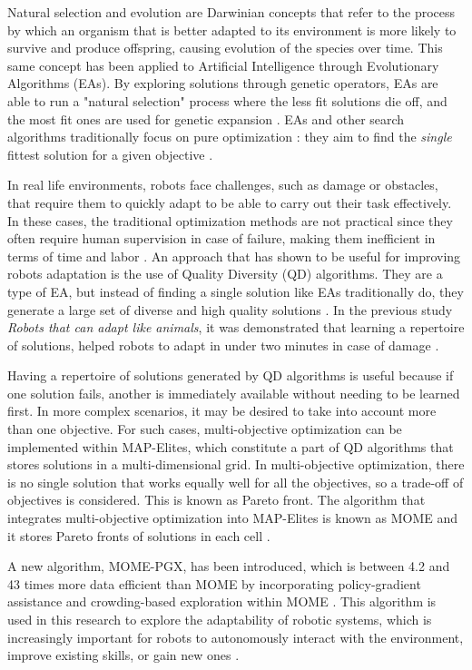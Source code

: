 \documentclass[12pt]{article}
\begin{document}
Natural selection and evolution are Darwinian concepts that refer to the process by which an organism that is better adapted to its environment is more likely to survive and produce offspring, causing evolution of the species over time. This same concept has been applied to Artificial Intelligence through Evolutionary Algorithms (EAs). By exploring solutions through genetic operators, EAs are able to run a "natural selection" process where the less fit solutions die off, and the most fit ones are used for genetic expansion \citep{Soni_2021}. EAs and other search algorithms traditionally focus on pure optimization \citep{Cully_Mouret_Doncieux_2019}: they aim to find the \textit{single} fittest solution for a given objective \citep{qian2024quality}.

In real life environments, robots face challenges, such as damage or obstacles, that require them to quickly adapt to be able to carry out their task effectively. In these cases, the traditional optimization methods are not practical since they often require human supervision in case of failure, making them inefficient in terms of time and labor \citep{kober2013reinforcement}. An approach that has shown to be useful for improving robots adaptation is the use of Quality Diversity (QD) algorithms. They are a type of EA, but instead of finding a single solution like EAs traditionally do, they generate a large set of diverse and high quality solutions \citep{Cully_Mouret_Doncieux_2019}. In the previous study \textit{Robots that can adapt like animals}, it was demonstrated that learning a repertoire of solutions, helped robots to adapt in under two minutes in case of damage \citep{cully2015robots}.

Having a repertoire of solutions generated by QD algorithms is useful because if one solution fails, another is immediately available without needing to be learned first. In more complex scenarios, it may be desired to take into account more than one objective. For such cases, multi-objective optimization can be implemented within MAP-Elites, which constitute a part of QD algorithms that stores solutions in a multi-dimensional grid. In multi-objective optimization, there is no single solution that works equally well for all the objectives, so a trade-off of objectives is considered. This is known as Pareto front. The algorithm that integrates multi-objective optimization into MAP-Elites is known as MOME and it stores Pareto fronts of solutions in each cell \citep{mouret2015illuminating}. 

A new algorithm, MOME-PGX, has been introduced, which is between 4.2 and 43 times more data efficient than MOME by incorporating policy-gradient assistance and crowding-based exploration within MOME \citep{janmohamed2023improving}. This algorithm is used in this research to explore the adaptability of robotic systems, which is increasingly important for robots to autonomously interact with the environment, improve existing skills, or gain new ones \citep{nolfi2022progress}. 
\end{document}
